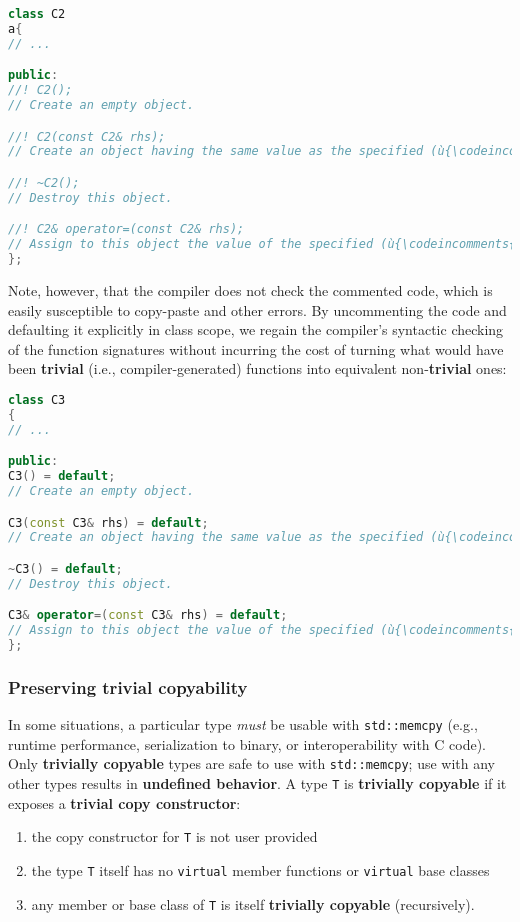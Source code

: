\begin{lstlisting}[language=C++]
class C2
a{
// ...

public:
//! C2();
// Create an empty object.

//! C2(const C2& rhs);
// Create an object having the same value as the specified (ù{\codeincomments{rhs}}ù) object.

//! ~C2();
// Destroy this object.

//! C2& operator=(const C2& rhs);
// Assign to this object the value of the specified (ù{\codeincomments{rhs}}ù) object.
};
\end{lstlisting}

\noindent Note, however, that the compiler does not check the commented code, which is easily susceptible to copy-paste and other errors. By
uncommenting the code and defaulting it explicitly in class scope, we
regain the compiler's syntactic checking of the function signatures
without incurring the cost of turning what would have been
\textbf{trivial} (i.e., compiler-generated) functions into equivalent
non-\textbf{trivial} ones:

\begin{lstlisting}[language=C++]
class C3
{
// ...

public:
C3() = default;
// Create an empty object.

C3(const C3& rhs) = default;
// Create an object having the same value as the specified (ù{\codeincomments{rhs}}ù) object.

~C3() = default;
// Destroy this object.

C3& operator=(const C3& rhs) = default;
// Assign to this object the value of the specified (ù{\codeincomments{rhs}}ù) object.
};
\end{lstlisting}


\subsubsection[Preserving trivial copyability]{Preserving trivial copyability}\label{preserving-trivial-copyability}

In some situations, a particular type \textit{must} be
usable with \texttt{std::memcpy} (e.g., runtime performance,
serialization to binary, or interoperability with C code). Only
\textbf{trivially copyable} types are safe to use with
\texttt{std::memcpy}; use with any other types results in
\textbf{undefined behavior}. A type \texttt{T} is \textbf{trivially
copyable} if it exposes a \textbf{trivial copy constructor}:
\begin{enumerate}
\item{the copy constructor for \texttt{T} is not user provided}
\item{the type \texttt{T} itself has no \texttt{virtual} member functions or
\texttt{virtual} base classes}
\item{any member or base class of
\texttt{T} is itself \textbf{trivially copyable} (recursively).}
\end{enumerate}

